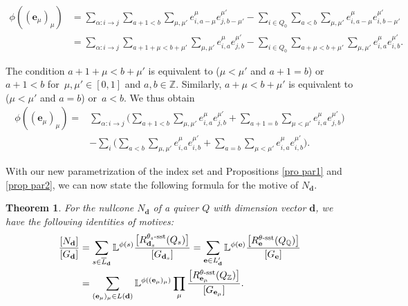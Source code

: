 \documentclass[10pt,a4paper]{amsart}
\numberwithin{equation}{section}
\newtheorem{Theorem}{Theorem}[section]
\theoremstyle{definition}
\begin{document}
\begin{align*}
\phi((\mathbf{e}_\mu)_\mu) &= \sum_{\alpha\colon i \rightarrow j} \sum_{a+1 <b}\sum_{\mu,\mu'} e^\mu_{i,a-\mu} e^{\mu'}_{j,b-\mu'} - \sum_{ i \in Q_0} \sum_{a < b}\sum_{\mu,\mu'} e^\mu_{i,a-\mu} e^{\mu'}_{i,b-\mu'} \\
&= \sum_{\alpha\colon i \rightarrow j} \sum_{a+1+\mu <b+\mu'}\sum_{\mu,\mu'} e^\mu_{i,a} e^{\mu'}_{j,b} - \sum_{ i \in Q_0} \sum_{a+\mu < b+\mu'}\sum_{\mu,\mu'} e^\mu_{i,a} e^{\mu'}_{i,b}.
\end{align*}


The condition $a+1+\mu < b+\mu' $ is equivalent to ($\mu < \mu'$ and $ a+1=b$) or $a+1<b$ for~${\mu, \mu' \in [0,1]}$ and $a,b \in \mathbb{Z}$. Similarly, $a+\mu<b+\mu'$ is equivalent to ($\mu < \mu'$ and $ a=b$) or~${a<b}$.
We thus obtain
\begin{align*}
\phi((\mathbf{e}_{\mu})_{\mu}) ={}& \sum_{\alpha\colon i \rightarrow j} \biggl(\sum_{a+1 < b} \sum_{\mu, \mu'} e_{i,a}^{\mu} e_{j,b}^{\mu'} + \sum_{a+1 = b} \sum_{\mu < \mu'} e_{i,a}^{\mu} e_{j,b}^{\mu'}\biggr) \\
&- \sum_{i} \biggl(\sum_{a < b} \sum_{\mu, \mu'} e_{i,a}^{\mu} e_{i,b}^{\mu'} + \sum_{a = b} \sum_{\mu < \mu'} e_{i,a}^{\mu} e_{i,b}^{\mu'}\biggr) .
\end{align*}

With our new parametrization of the index set and Propositions \ref{pro par1} and \ref{prop par2}, we can now state the following formula for the motive of $N_{\mathbf{d}}$.


\begin{Theorem} \label{theo mot}
For the nullcone $N_{\mathbf{d}}$ of a quiver $Q$ with dimension vector $\mathbf{d}$, we have the following identities of motives:
\begin{align*}
\begin{split}
\frac{[N_{\mathbf{d}}]}{[G_{\mathbf{d}}]}
&= \sum_{s \in \overline{L}_{\mathbf{d}}} \mathbb{L}^{\phi(s)} \frac{\big[R^{\theta_s\text{\rm -sst}}_{\mathbf{d}_s}(Q_s)\big]}{[G_{\mathbf{d}_s}]} = \sum_{\mathbf{e} \in L'_{\mathbf{d}}} \mathbb{L}^{\phi(\mathbf{e})} \frac{\big[R_{\mathbf{e}}^{\theta\text{\rm -sst}}(Q_{\mathbb{Q}})\big]}{[G_{\mathbf{e}}]} \\
&= \sum_{(\mathbf{e}_\mu)_\mu\in L(\mathbf{d})} \mathbb{L}^{\phi((\mathbf{e}_\mu)_\mu)}\prod_{\mu} \frac{\big[R_{\mathbf{e}_{\mu}}^{\theta\text{\rm -sst}} (Q_{\mathbb{Z}})\big]}{[G_{\mathbf{e}_{\mu}}]} .
\end{split}
\end{align*}
\end{Theorem}
\end{document}
